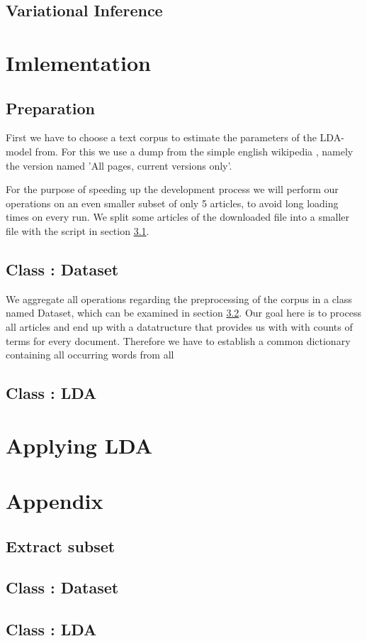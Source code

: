 \documentclass[15pt,landscape,twopage]{article}
\begin{document}
\subsection{Variational Inference}


\section{Imlementation}
\subsection{Preparation}
First we have to choose a text corpus to estimate the parameters of the LDA-model from. For this we use a dump from the simple english wikipedia \cite{simplewi84:online}, namely the version named 'All pages, current versions only'.

For the purpose of speeding up the development process we will perform our operations on an even smaller subset of only 5 articles, to avoid long loading times on every run. We split some articles of the downloaded file into a smaller file with the script in section \ref{extract}.

\subsection{Class : Dataset}
We aggregate all operations regarding the preprocessing of the corpus in a class named Dataset, which can be examined in section  \ref{class:dataset}. Our goal here is to process all articles and end up with a datatructure that provides us with with counts of terms for every document. Therefore we have to establish a common dictionary containing all occurring words from all

\subsection{Class : LDA}

\section{Applying LDA}
\newpage




\newpage
\section{Appendix}
\subsection{Extract subset} \label{extract}


\subsection{Class : Dataset} \label{class:dataset}


\subsection{Class : LDA} \label{class:lda}

\end{document}
